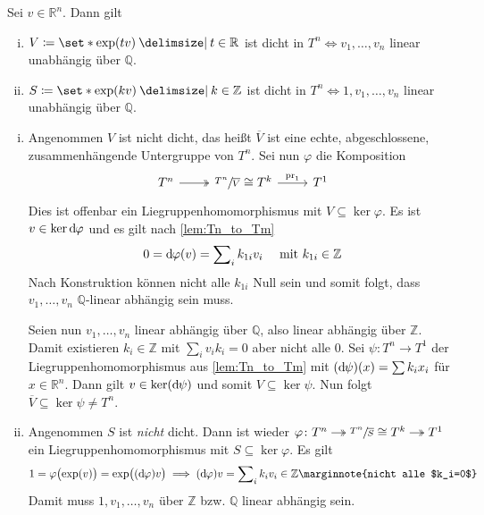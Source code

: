 \begin{satz}[label=satz:dichte_tm_torus]
	Sei $v \in \mathbb{R}^n$.
	Dann gilt
	\begin{enumerate}[(i)]
		\item $V \coloneqq \set*{\exp(tv) \given t \in \mathbb{R}}$ ist dicht in $T^n \iff v_1,\ldots ,v_n$ linear unabhängig über $\mathbb{Q}$.
		\item $S \coloneqq \set*{\exp(kv) \given k \in \mathbb{Z}}$ ist dicht in $T^n \iff 1, v_1, \ldots ,v_n$ linear unabhängig über $\mathbb{Q}$.
	\end{enumerate}
\end{satz}
\begin{beweis}
	\begin{enumerate}[(i)]
		\item Angenommen $V$ ist nicht dicht, das heißt $\overline{V}$ ist eine echte, abgeschlossene, zusammenhängende Untergruppe von $T^n$.
		Sei nun $\varphi$ die Komposition
		\[
			\begin{tikzcd}
				T^n \rar[two heads] & \sfrac{T^n}{\overline{V}} \cong T^k \rar["\pr_1"] & T^1
			\end{tikzcd}
		\]
		Dies ist offenbar ein Liegruppenhomomorphismus mit $V \subseteq \ker \varphi$.
		Es ist $v \in \ker \mathrm{d}\mkern-1.0mu \varphi$ und es gilt nach \autoref{lem:Tn_to_Tm}
		\[
			0 = \mathrm{d}\mkern-1.0mu \varphi(v) = \sum\nolimits_i k_{1i} v_i \quad  \text{ mit } k_{1i} \in \mathbb{Z} 
		\]
		Nach Konstruktion können nicht alle $k_{1i}$ Null sein und somit folgt, dass $v_1, \ldots ,v_n$ $\mathbb{Q}$-linear abhängig sein muss.
		
		Seien nun $v_1, \ldots ,v_n$ linear abhängig über $\mathbb{Q}$, also linear abhängig über $\mathbb{Z}$. 
		Damit existieren $k_i \in \mathbb{Z}$ mit $\sum_i v_i k_i =0$ aber nicht alle $0$.
		Sei $\psi \colon T^n \to T^1$ der Liegruppenhomomorphismus aus \autoref{lem:Tn_to_Tm} mit $(\mathrm{d}\mkern-1.0mu \psi)(x) = \sum k_i x_i$ für $x \in \mathbb{R}^n$.
		Dann gilt $v \in \ker (\mathrm{d}\mkern-1.0mu \psi)$ und somit $V \subseteq \ker \psi$.
		Nun folgt $\overline{V} \subseteq \ker \psi \neq T^n$.
		\item Angenommen $S$ ist \emph{nicht} dicht.
		Dann ist wieder
		\(
			\begin{tikzcd}[sep=small,cramped]
				\varphi \colon T^n \rar[two heads] & \sfrac{T^n}{\overline{S}} \cong T^k  \rar[two heads] & T^1
			\end{tikzcd}
		\)
		ein Liegruppenhomomorphismus mit $S \subseteq \ker \varphi$.
		Es gilt
		\[
			1 = \varphi \enbrace[\big]{\exp(v)} = \exp \enbrace[\big]{(\mathd \varphi) v} \implies (\mathd \varphi) v = \sum\nolimits_i k_i v_i \in \mathbb{Z}\marginnote{nicht alle $k_i=0$}
		\]
		Damit muss $1, v_1, \ldots ,v_n$ über $\mathbb{Z}$ bzw. $\mathbb{Q}$ linear abhängig sein.
		

\end{enumerate}
\end{beweis}
